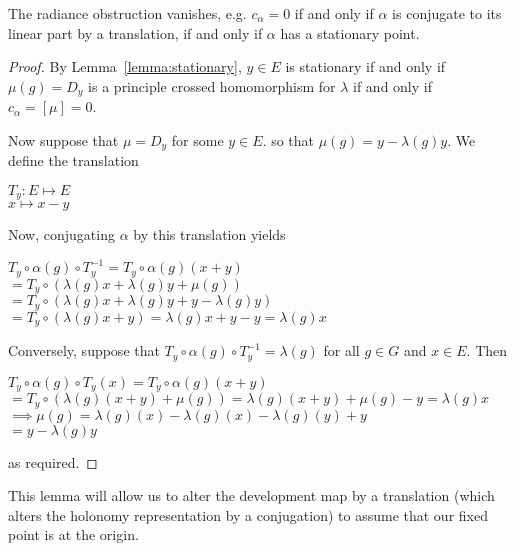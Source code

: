 \begin{lemma}
    The radiance obstruction vanishes, e.g. $c_{\alpha} = 0$ if and only if
    $\alpha$ is conjugate to its linear part by a translation, if and only if $\alpha$
    has a stationary point.
\end{lemma}
\begin{proof}
    By Lemma~\ref{lemma:stationary}, $y \in E$ is stationary if and only if
    $\mu(g) = D_y$ is a principle crossed homomorphism for $\lambda$ if and only
    if $c_{\alpha} = [\mu] =0$.

    Now suppose that $\mu =D_y$ for some $y \in E$. so that $\mu(g) = y -
        \lambda(g)y$. We define the translation
    \begin{center}
        $T_y : E \mapsto E$\\
        $ x \mapsto x-y$
    \end{center}
    Now, conjugating $\alpha$ by this translation yields
    \begin{center}
        $T_y \circ \alpha(g) \circ T_y^{-1} = T_y\circ \alpha(g)(x+y)$\\
        $= T_y\circ(\lambda(g)x  + \lambda(g)y + \mu(g))$\\
        $= T_y \circ (\lambda(g)x + \lambda(g)y +y - \lambda(g)y)$\\
        $= T_y \circ (\lambda(g)x +y ) = \lambda(g)x +y-y = \lambda(g)x$
    \end{center}

    Conversely, suppose that $T_y \circ \alpha(g) \circ T_y^{-1} = \lambda(g)$ for
    all $g \in G$ and $x \in E$. Then
    \begin{center}
        $T_y \circ \alpha(g) \circ T_y(x) = T_y \circ \alpha(g)(x+y)$\\
        $= T_y \circ (\lambda(g)(x+y) + \mu(g)) = \lambda(g)(x+y)+\mu(g)-y = \lambda(g)x$\\
        $\implies \mu(g) = \lambda(g)(x) - \lambda(g)(x) - \lambda(g)(y) +y$\\
        $= y - \lambda(g)y$
    \end{center}
    as required.
\end{proof}

\begin{remark}
    This lemma will allow us to alter the development map by a translation (which
    alters the holonomy representation by a conjugation) to assume that our fixed
    point is at the origin.
\end{remark}

